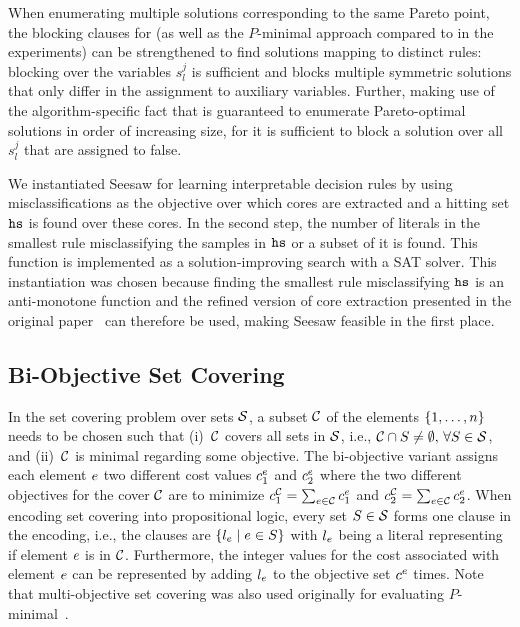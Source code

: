 When enumerating multiple solutions corresponding to the same Pareto point, the blocking clauses for \algname{} (as well as the $P$-minimal approach compared to in the experiments) can be strengthened to find solutions mapping to distinct rules:
blocking over the variables $s_l^j$ is sufficient and blocks multiple symmetric solutions that only differ in the assignment to auxiliary variables.
Further, making use of the algorithm-specific fact that \algname{} is guaranteed to enumerate Pareto-optimal solutions in order of increasing size, for \algname{} it is sufficient to block a solution over all $s_l^j$ that are assigned to false.

We instantiated Seesaw for learning interpretable decision rules by using misclassifications as the objective over which cores are extracted and a hitting set $\texttt{hs}$ is found over these cores.
In the second step, the number of literals in the smallest rule misclassifying the samples in $\texttt{hs}$ or a subset of it is found.
This function is implemented as a solution-improving search with a SAT solver.
This instantiation was chosen because finding the smallest rule misclassifying $\texttt{hs}$ is an anti-monotone function and the refined version of core extraction presented in the original paper~\autocite{DBLP:conf/cp/JanotaMSM21} can therefore be used, making Seesaw feasible in the first place.

\subsection{Bi-Objective Set Covering}

In the set covering problem over sets $\mathcal{S}$, a subset $\mathcal{C}$ of the elements $\{1,\dots,n\}$ needs to be chosen such that (i)~$\mathcal{C}$ covers all sets in $\mathcal{S}$, i.e., $\mathcal{C}\cap S\neq\emptyset,\,\forall S\in\mathcal{S}$, and (ii)~$\mathcal{C}$ is minimal regarding some objective.
The bi-objective variant assigns each element $e$ two different cost values $c^e_1$ and $c^e_2$ where the two different objectives for the cover $\mathcal{C}$ are to minimize $c^{\mathcal{C}}_1 = \sum_{e\in\mathcal{C}}c^e_1$ and $c^{\mathcal{C}}_2 = \sum_{e\in\mathcal{C}}c^e_2$.
When encoding set covering into propositional logic, every set $S\in\mathcal{S}$ forms one clause in the encoding, i.e., the clauses are $\{l_e \mid e\in S\}$ with $l_e$ being a literal representing if element $e$ is in $\mathcal{C}$.
Furthermore, the integer values for the cost associated with element $e$ can be represented by adding $l_e$ to the objective set $c^e$ times.
Note that multi-objective set covering was also used originally for evaluating $P$-minimal~\autocite{DBLP:conf/cp/SohBTB17}.

